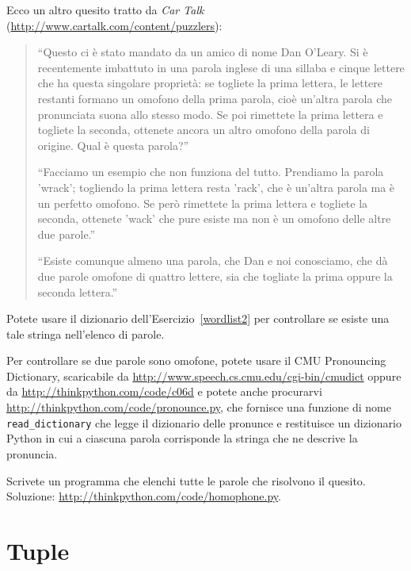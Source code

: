 \documentclass[10pt]{book}
\begin{document}
\vspace{0.2in}
\begin{exercise}

Ecco un altro quesito tratto da {\em Car
Talk} (\url{http://www.cartalk.com/content/puzzlers}):

\begin{quote}
``Questo ci è stato mandato da un amico di nome Dan O'Leary. Si è recentemente imbattuto in una parola inglese di una sillaba e cinque lettere che ha questa singolare proprietà: se togliete la prima lettera, le lettere restanti formano un omofono della prima parola, cioè un'altra parola che pronunciata suona allo stesso modo. Se poi rimettete la prima lettera e togliete la seconda, ottenete ancora un altro omofono della parola di origine. Qual è questa parola?''

``Facciamo un esempio che non funziona del tutto. Prendiamo la parola 'wrack'; togliendo la prima lettera resta 'rack', che è un'altra parola ma è un perfetto omofono. Se però rimettete la prima lettera e togliete la seconda, ottenete 'wack' che pure esiste ma non è un omofono delle altre due parole.''

``Esiste comunque almeno una parola, che Dan e noi conosciamo, che dà due parole omofone di quattro lettere, sia che togliate la prima oppure la seconda lettera.''
\end{quote}

Potete usare il dizionario dell'Esercizio~\ref{wordlist2} per controllare se esiste una tale stringa nell'elenco di parole.

Per controllare se due parole sono omofone, potete usare il CMU Pronouncing Dictionary, scaricabile da
\url{http://www.speech.cs.cmu.edu/cgi-bin/cmudict} oppure da
\url{http://thinkpython.com/code/c06d} e potete anche procurarvi
\url{http://thinkpython.com/code/pronounce.py}, che fornisce una funzione di nome \verb"read_dictionary" che legge il dizionario delle pronunce e restituisce un dizionario Python in cui a ciascuna parola corrisponde la stringa che ne descrive la pronuncia.

Scrivete un programma che elenchi tutte le parole che risolvono il quesito. Soluzione: \url{http://thinkpython.com/code/homophone.py}.

\end{exercise}



\chapter{Tuple}
\label{tuplechap}
\end{document}
